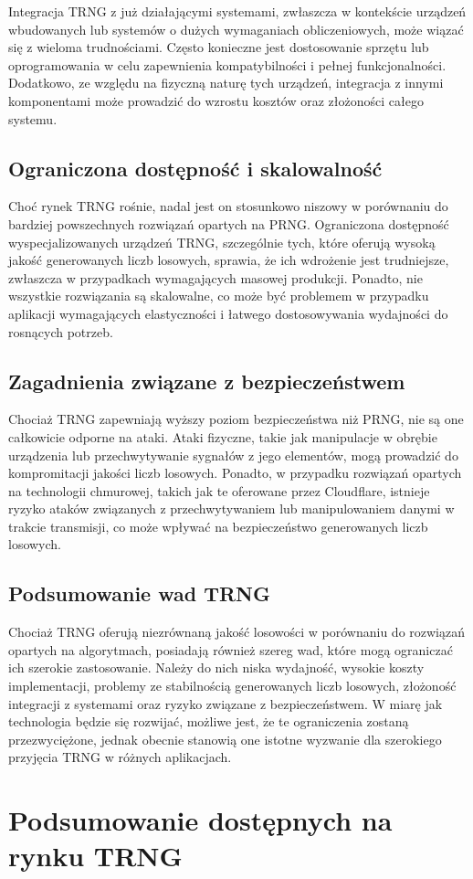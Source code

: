 Integracja TRNG z już działającymi systemami, zwłaszcza w kontekście urządzeń wbudowanych lub systemów o dużych wymaganiach obliczeniowych, może wiązać się z wieloma trudnościami. Często konieczne jest dostosowanie sprzętu lub oprogramowania w celu zapewnienia kompatybilności i pełnej funkcjonalności. Dodatkowo, ze względu na fizyczną naturę tych urządzeń, integracja z innymi komponentami może prowadzić do wzrostu kosztów oraz złożoności całego systemu.

\subsection{Ograniczona dostępność i skalowalność}

Choć rynek TRNG rośnie, nadal jest on stosunkowo niszowy w porównaniu do bardziej powszechnych rozwiązań opartych na PRNG. Ograniczona dostępność wyspecjalizowanych urządzeń TRNG, szczególnie tych, które oferują wysoką jakość generowanych liczb losowych, sprawia, że ich wdrożenie jest trudniejsze, zwłaszcza w przypadkach wymagających masowej produkcji. Ponadto, nie wszystkie rozwiązania są skalowalne, co może być problemem w przypadku aplikacji wymagających elastyczności i łatwego dostosowywania wydajności do rosnących potrzeb.

\subsection{Zagadnienia związane z bezpieczeństwem}

Chociaż TRNG zapewniają wyższy poziom bezpieczeństwa niż PRNG, nie są one całkowicie odporne na ataki. Ataki fizyczne, takie jak manipulacje w obrębie urządzenia lub przechwytywanie sygnałów z jego elementów, mogą prowadzić do kompromitacji jakości liczb losowych. Ponadto, w przypadku rozwiązań opartych na technologii chmurowej, takich jak te oferowane przez Cloudflare, istnieje ryzyko ataków związanych z przechwytywaniem lub manipulowaniem danymi w trakcie transmisji, co może wpływać na bezpieczeństwo generowanych liczb losowych.

\subsection{Podsumowanie wad TRNG}

Chociaż TRNG oferują niezrównaną jakość losowości w porównaniu do rozwiązań opartych na algorytmach, posiadają również szereg wad, które mogą ograniczać ich szerokie zastosowanie. Należy do nich niska wydajność, wysokie koszty implementacji, problemy ze stabilnością generowanych liczb losowych, złożoność integracji z systemami oraz ryzyko związane z bezpieczeństwem. W miarę jak technologia będzie się rozwijać, możliwe jest, że te ograniczenia zostaną przezwyciężone, jednak obecnie stanowią one istotne wyzwanie dla szerokiego przyjęcia TRNG w różnych aplikacjach.

\section{Podsumowanie dostępnych na rynku TRNG}